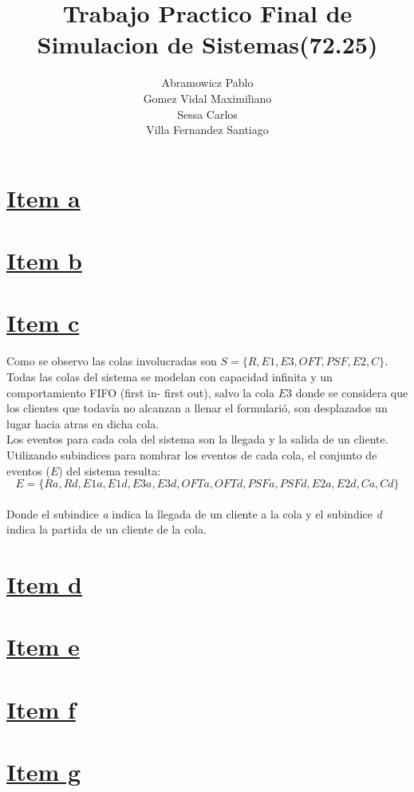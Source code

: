 \documentclass[a4paper,10pt]{article}
\title{Trabajo Practico Final de Simulacion de Sistemas(72.25)}
\author{
Abramowicz Pablo\\
Gomez Vidal Maximiliano\\
Sessa Carlos\\
Villa Fernandez Santiago\\
}
\begin{document}
\maketitle

\section*{\underline{Item a}}
\section*{\underline{Item b}}
\section*{\underline{Item c}}
Como se observo las colas involucradas son $S = \{R, E1, E3, OFT, PSF, E2, C\}$.\\
Todas las colas del sistema se modelan con capacidad infinita y un comportamiento FIFO (first in- first out), salvo la cola $E3$ 
donde se considera que los clientes que todav\'ia no alcanzan a llenar el formulari\'o, son desplazados un lugar hacia atras en dicha cola.\\
Los eventos para cada cola del sistema son la llegada y la salida de un cliente.
Utilizando subindices para nombrar los eventos de cada cola, el conjunto de eventos ($E$) del sistema resulta:\\
$$E = \{Ra , Rd , E1a , E1d , E3a , E3d , OFTa , OFTd , PSFa , PSFd , E2a , E2d , Ca , Cd \}$$\\
Donde el subindice \textit{a} indica la llegada de un cliente a la cola y el subindice \textit{d} indica la partida de un cliente de la cola.

\section*{\underline{Item d}}
\section*{\underline{Item e}}
\section*{\underline{Item f}}
\section*{\underline{Item g}}
\end{document}
